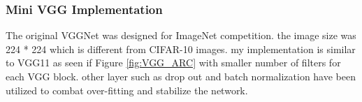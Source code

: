 \documentclass[10pt,twocolumn,letterpaper]{article}
\begin{document}
\subsubsection{Mini VGG Implementation}
The original VGGNet was designed for ImageNet competition. the image size was 224 * 224 which is different from CIFAR-10 images. my implementation is similar to VGG11 as seen if Figure \ref{fig:VGG_ARC} with smaller number of filters for each VGG block. other layer such as drop out and batch normalization have been utilized to combat over-fitting and stabilize the network.  












{\small


}
\end{document}
